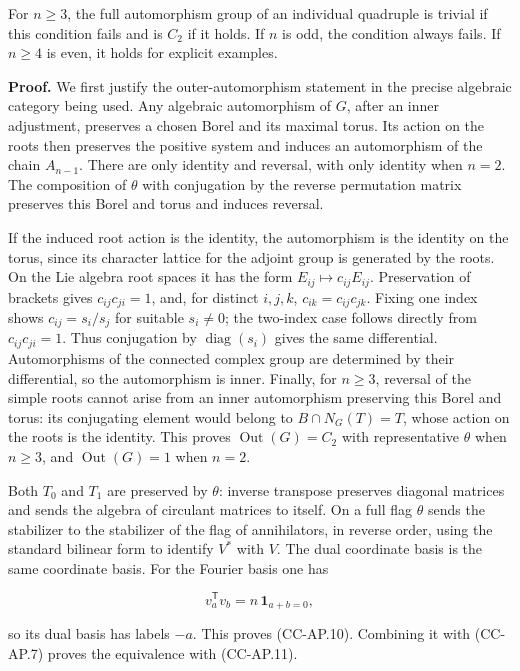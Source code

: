 For \(n\geq3\), the full automorphism group of an individual quadruple
is trivial if this condition fails and is \(C_2\) if it holds. If \(n\)
is odd, the condition always fails. If \(n\geq4\) is even, it holds for
explicit examples.

\textbf{Proof.} We first justify the outer-automorphism statement in the
precise algebraic category being used. Any algebraic automorphism of
\(G\), after an inner adjustment, preserves a chosen Borel and its
maximal torus. Its action on the roots then preserves the positive
system and induces an automorphism of the chain \(A_{n-1}\). There are
only identity and reversal, with only identity when \(n=2\). The
composition of \(\theta\) with conjugation by the reverse permutation
matrix preserves this Borel and torus and induces reversal.

If the induced root action is the identity, the automorphism is the
identity on the torus, since its character lattice for the adjoint group
is generated by the roots. On the Lie algebra root spaces it has the
form \(E_{ij}\mapsto c_{ij}E_{ij}\). Preservation of brackets gives
\(c_{ij}c_{ji}=1\), and, for distinct \(i,j,k\),
\(c_{ik}=c_{ij}c_{jk}\). Fixing one index shows \(c_{ij}=s_i/s_j\) for
suitable \(s_i\ne0\); the two-index case follows directly from
\(c_{ij}c_{ji}=1\). Thus conjugation by \(\operatorname{diag}(s_i)\)
gives the same differential. Automorphisms of the connected complex
group are determined by their differential, so the automorphism is
inner. Finally, for \(n\geq3\), reversal of the simple roots cannot
arise from an inner automorphism preserving this Borel and torus: its
conjugating element would belong to \(B\cap N_G(T)=T\), whose action on
the roots is the identity. This proves \(\operatorname{Out}(G)=C_2\)
with representative \(\theta\) when \(n\geq3\), and
\(\operatorname{Out}(G)=1\) when \(n=2\).

Both \(T_0\) and \(T_1\) are preserved by \(\theta\): inverse transpose
preserves diagonal matrices and sends the algebra of circulant matrices
to itself. On a full flag \(\theta\) sends the stabilizer to the
stabilizer of the flag of annihilators, in reverse order, using the
standard bilinear form to identify \(V^*\) with \(V\). The dual
coordinate basis is the same coordinate basis. For the Fourier basis one
has

\[
 v_a^{\mathsf T}v_b=n\,\mathbf 1_{a+b=0},
\]

so its dual basis has labels \(-a\). This proves (CC-AP.10). Combining
it with (CC-AP.7) proves the equivalence with (CC-AP.11).

